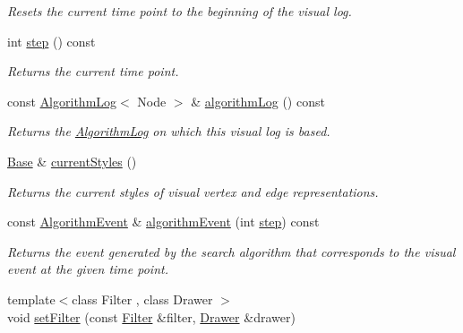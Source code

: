 \begin{DoxyCompactItemize}
\begin{DoxyCompactList}\small\item\em Resets the current time point to the beginning of the visual log. \end{DoxyCompactList}\item 
int \hyperlink{structslb_1_1core_1_1ui_1_1VisualLog_a94ff08077c466eadb304d2564a22869c}{step} () const 
\begin{DoxyCompactList}\small\item\em Returns the current time point. \end{DoxyCompactList}\item 
const \hyperlink{structslb_1_1core_1_1ui_1_1AlgorithmLog}{Algorithm\+Log}$<$ Node $>$ \& \hyperlink{structslb_1_1core_1_1ui_1_1VisualLog_ad8868dfa8b73db544f4166342f3eb383}{algorithm\+Log} () const 
\begin{DoxyCompactList}\small\item\em Returns the \hyperlink{structslb_1_1core_1_1ui_1_1AlgorithmLog}{Algorithm\+Log} on which this visual log is based. \end{DoxyCompactList}\item 
\hyperlink{structslb_1_1core_1_1ui_1_1CurrentStyles}{Base} \& \hyperlink{structslb_1_1core_1_1ui_1_1VisualLog_a823ccc5bad2fa22bfbed3305c21d49f7}{current\+Styles} ()
\begin{DoxyCompactList}\small\item\em Returns the current styles of visual vertex and edge representations. \end{DoxyCompactList}\item 
const \hyperlink{structslb_1_1core_1_1ui_1_1VisualLog_a699a50e2c261b3dec6cd2fa6bfd4b295}{Algorithm\+Event} \& \hyperlink{structslb_1_1core_1_1ui_1_1VisualLog_a3972011421712774f0bfa378d2b60c0c}{algorithm\+Event} (int \hyperlink{structslb_1_1core_1_1ui_1_1VisualLog_a94ff08077c466eadb304d2564a22869c}{step}) const 
\begin{DoxyCompactList}\small\item\em Returns the event generated by the search algorithm that corresponds to the visual event at the given time point. \end{DoxyCompactList}\item 
{\footnotesize template$<$class Filter , class Drawer $>$ }\\void \hyperlink{structslb_1_1core_1_1ui_1_1VisualLog_a1e7beab394cf1b5113c5b1b74355f411}{set\+Filter} (const \hyperlink{structslb_1_1core_1_1ui_1_1Filter}{Filter} \&filter, \hyperlink{structslb_1_1core_1_1ui_1_1Drawer}{Drawer} \&drawer)

\end{DoxyCompactItemize}
